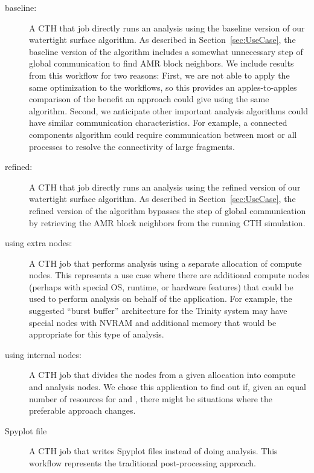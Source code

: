 \begin{description}

\item [\Insitu baseline:] A CTH that job directly runs an \insitu analysis
  using the baseline version of our watertight surface algorithm.  As
  described in Section~\ref{sec:UseCase}, the baseline version of the
  algorithm includes a somewhat unnecessary step of global communication to
  find AMR block neighbors.  We include results from this workflow for two
  reasons: First, we are not able to apply the same optimization to the
  \intransit workflows, so this provides an apples-to-apples comparison
  of the benefit an \intransit approach could give using the same
  algorithm.  Second, we anticipate other important analysis algorithms
  could have similar communication characteristics.  For example, a
  connected components algorithm could require communication between most
  or all processes to resolve the connectivity of large fragments.

\item [\Insitu refined:] A CTH that job directly runs an \insitu analysis
  using the refined version of our watertight surface algorithm.  As
  described in Section~\ref{sec:UseCase}, the refined version of the
  algorithm bypasses the step of global communication by retrieving the AMR
  block neighbors from the running CTH simulation.

\item [\Intransit using extra nodes:] A CTH job that performs \intransit
  analysis using a separate allocation of compute nodes.  This represents a
  use case where there are additional compute nodes (perhaps with special
  OS, runtime, or hardware features) that could be used to perform analysis
  on behalf of the application.  For example, the suggested ``burst
  buffer'' architecture for the Trinity system may have special nodes with
  NVRAM and additional memory that would be appropriate for this type of
  \intransit analysis.

\item [\Intransit using internal nodes:] A CTH job that divides the nodes
  from a given allocation into compute and analysis nodes.  We chose this
  application to find out if, given an equal number of resources for
  \insitu and \intransit, there might be situations where the preferable
  approach changes.

\item [Spyplot file] A CTH job that writes Spyplot files instead of doing
  analysis.  This workflow represents the traditional post-processing
  approach.
\end{description}


